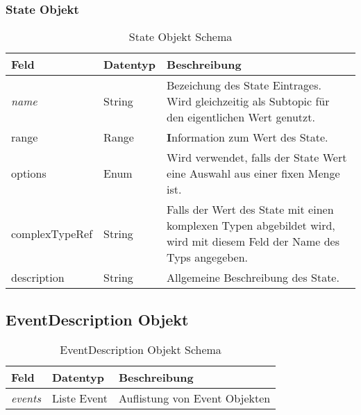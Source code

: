 \subsubsection{State Objekt}
\begin{table}[H]
\begin{tabularx}{\textwidth}{|l|l|X|}

 \hline
 {\bf Feld } & {\bf Datentyp } & {\bf Beschreibung } \\  \hline

 \textit{name}  &   String   & Bezeichung des State Eintrages. Wird gleichzeitig als Subtopic für den eigentlichen Wert genutzt.  \\ \hline
 range  &   Range   &  \textbf Information zum Wert des State.   \\ \hline
 options  &   Enum   & Wird verwendet, falls der State Wert eine Auswahl aus einer fixen Menge ist.   \\ \hline
 complexTypeRef  &   String   & Falls der Wert des State mit einen komplexen Typen abgebildet wird, wird mit diesem Feld der Name des Typs angegeben.   \\ \hline
 description  &   String   &  Allgemeine Beschreibung des State.  \\ \hline

\end{tabularx}
\caption{State Objekt Schema}
\end{table}


\subsection{EventDescription Objekt}
\begin{table}[H]
\begin{tabularx}{\textwidth}{|l|l|X|}

 \hline
 {\bf Feld } & {\bf Datentyp } & {\bf Beschreibung } \\  \hline

 \textit{events}  &   Liste Event   & Auflistung von Event Objekten   \\ \hline

\end{tabularx}
\caption{EventDescription Objekt Schema}
\end{table}



